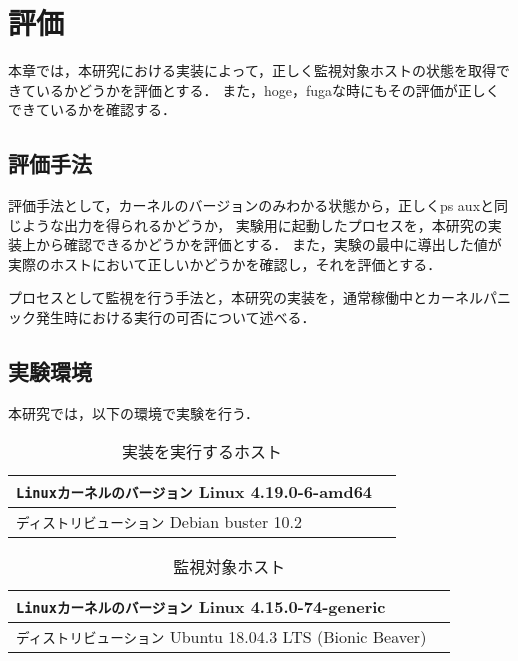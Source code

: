 \chapter{評価}
\label{chap:evaluation}

本章では，本研究における実装によって，正しく監視対象ホストの状態を取得できているかどうかを評価とする．
また，hoge，fugaな時にもその評価が正しくできているかを確認する．

\section{評価手法}

評価手法として，カーネルのバージョンのみわかる状態から，正しくps auxと同じような出力を得られるかどうか，
実験用に起動したプロセスを，本研究の実装上から確認できるかどうかを評価とする．
また，実験の最中に導出した値が実際のホストにおいて正しいかどうかを確認し，それを評価とする．

プロセスとして監視を行う手法と，本研究の実装を，通常稼働中とカーネルパニック発生時における実行の可否について述べる．

\section{実験環境}

本研究では，以下の環境で実験を行う．

\begin{table}[htbp]
    \caption{実装を実行するホスト}
    \begin{center}
      \begin{tabular}{ll}
      \hline
      \verb|Linuxカーネルのバージョン| Linux 4.19.0-6-amd64 \\
      \hline
      \verb|ディストリビューション| Debian buster 10.2 \\
      \hline
      \end{tabular}
    \end{center}
  \end{table}

  \begin{table}[htbp]
    \caption{監視対象ホスト}
    \begin{center}
      \begin{tabular}{ll}
      \hline
      \verb|Linuxカーネルのバージョン| Linux 4.15.0-74-generic \\
      \hline
      \verb|ディストリビューション| Ubuntu 18.04.3 LTS (Bionic Beaver) \\
      \hline
      \end{tabular}
    \end{center}
  \end{table}

